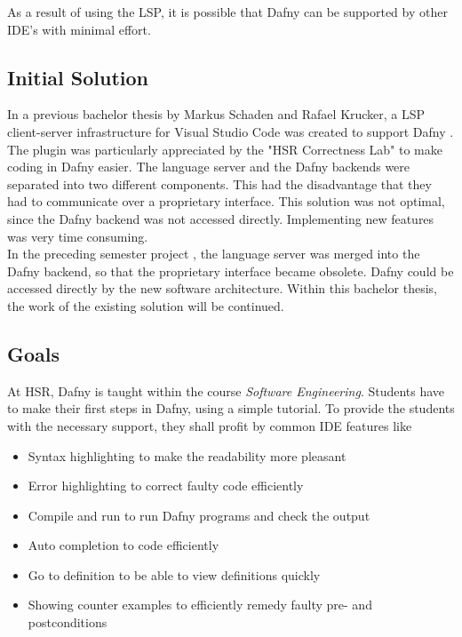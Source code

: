 As a result of using the LSP, it is possible that Dafny can be supported by other IDE's with minimal effort.

\subsection{Initial Solution}
\label{section:management_summary:initialsolution}
In a previous bachelor thesis by Markus Schaden and Rafael Krucker, a LSP client-server infrastructure for Visual Studio Code was created to support Dafny \cite{ba}.
The plugin was particularly appreciated by the "HSR Correctness Lab" \cite{correctnessLab} to make coding in Dafny easier.
The language server and the Dafny backends were separated into two different components.
This had the disadvantage that they had to communicate over a proprietary interface.
This solution was not optimal, since the Dafny backend was not accessed directly.
Implementing new features was very time consuming. \\

In the preceding semester project \cite{sa}, the language server was merged into the Dafny backend, so that the proprietary interface became obsolete.
Dafny could be accessed directly by the new software architecture.
Within this bachelor thesis, the work of the existing solution will be continued.

\subsection{Goals}
At HSR, Dafny is taught within the course \textit{Software Engineering}.
Students have to make their first steps in Dafny, using a simple tutorial.
To provide the students with the necessary support, they shall profit by common IDE features like
\begin{itemize}
    \item Syntax highlighting to make the readability more pleasant
    \item Error highlighting to correct faulty code efficiently
    \item Compile and run to run Dafny programs and check the output
    \item Auto completion to code efficiently
    \item Go to definition to be able to view definitions quickly
    \item Showing counter examples to efficiently remedy faulty pre- and postconditions
\end{itemize}

